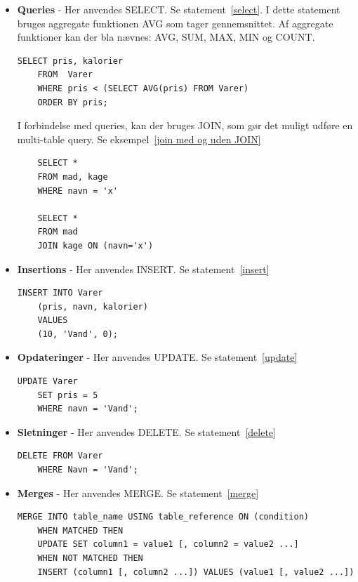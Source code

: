 \begin{itemize}
	\item \textbf{Queries} - Her anvendes SELECT. Se statement~\ref{select}. I dette statement bruges aggregate funktionen AVG som tager gennemsnittet. Af aggregate funktioner kan der bla nævnes: AVG, SUM, MAX, MIN og COUNT.
	\begin{lstlisting}[caption=Query med sub-query,label=select]
	SELECT pris, kalorier
	FROM  Varer
	WHERE pris < (SELECT AVG(pris) FROM Varer)
	ORDER BY pris;
	\end{lstlisting}
	
	I forbindelse med queries, kan der bruges JOIN, som gør det muligt udføre en multi-table query. Se eksempel~\ref{join med og uden JOIN}
	
	\begin{lstlisting}
	SELECT * 
	FROM mad, kage 
	WHERE navn = 'x'
	
	SELECT * 
	FROM mad 
	JOIN kage ON (navn='x') 
	\end{lstlisting}
		
	\item \textbf{Insertions} - Her anvendes INSERT. Se statement~\ref{insert}
	
	\begin{lstlisting}[caption=Brug af INSERT,label=insert]
	INSERT INTO Varer
	(pris, navn, kalorier)
	VALUES
	(10, 'Vand', 0);
	\end{lstlisting}
	
	\item \textbf{Opdateringer} - Her anvendes UPDATE. Se statement~\ref{update}
	
	\begin{lstlisting}[caption=Brug af UPDATE,label=update]
	UPDATE Varer
	SET pris = 5
	WHERE navn = 'Vand';
	\end{lstlisting}
	
	\item \textbf{Sletninger} - Her anvendes DELETE. Se statement~\ref{delete}
	
	\begin{lstlisting}[caption=brug af DELETE,label=delete]
	DELETE FROM Varer
	WHERE Navn = 'Vand';
	\end{lstlisting}
	
	\item \textbf{Merges} - Her anvendes MERGE. Se statement~\ref{merge}
	
	\begin{lstlisting}[caption=Brug af MERGE,label=merge]
	MERGE INTO table_name USING table_reference ON (condition)
	WHEN MATCHED THEN
	UPDATE SET column1 = value1 [, column2 = value2 ...]
	WHEN NOT MATCHED THEN
	INSERT (column1 [, column2 ...]) VALUES (value1 [, value2 ...])
	\end{lstlisting}
\end{itemize}
